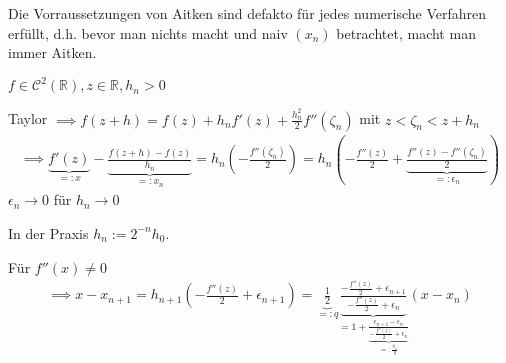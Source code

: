 \begin{remark}
	Die Vorraussetzungen von Aitken sind defakto für jedes numerische Verfahren erfüllt, d.h. bevor man nichts macht und naiv $(x_n)$ betrachtet, macht man immer Aitken.
\end{remark}

\begin{example}
	$f \in \mathcal{C}^2(\mathbb{R}), z \in \mathbb{R}, h_n > 0$
	
	Taylor $\implies f(z+h) = f(z) + h_nf'(z) + \frac{h_n^2}{2}f''(\zeta_n)$ mit $z < \zeta_n < z+h_n$
	\begin{align*}
		\implies \underbrace{f'(z)}_{=:x} - \underbrace{\frac{f(z+h) - f(z)}{h_n}}_{=:x_n} = h_n \left(-\frac{f''(\zeta_n)}{2}\right) = 
		h_n \left(-\frac{f''(z)}{2} + \underbrace{\frac{f''(z) - f''(\zeta_n)}{2}}_{=: \epsilon_n}\right)
	\end{align*}
	$\epsilon_n \rightarrow 0$ für $h_n \rightarrow 0$
	
	In der Praxis $h_n := 2^{-n}h_0$.
	
	Für $f''(x) \neq 0$
	\begin{align*}
		\implies x - x_{n+1} = h_{n+1} \left(-\frac{f''(z)}{2} + \epsilon_{n+1}\right) =
		\underbrace{\frac{1}{2}}_{=: q} \underbrace{\frac{-\frac{f''(z)}{2} + \epsilon_{n+1}}{- \frac{f''(z)}{2} + \epsilon_n}}_{ = 1 + \underbrace{\frac{\epsilon_{n+1} - \epsilon_n}{-\frac{f''(z)}{2} + \epsilon_n}}_{=: \frac{\delta_n}{q}}} (x - x_n)
	\end{align*}
\end{example}
